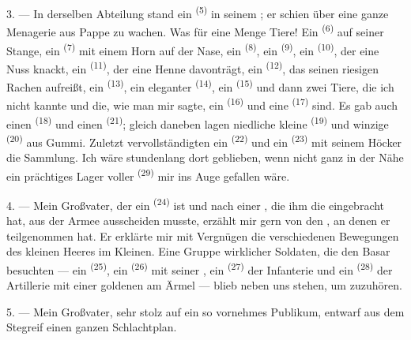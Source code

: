 3. --- In derselben Abteilung stand ein  \textsuperscript{(5)} in
seinem ; er schien über eine ganze Menagerie aus Pappe zu
wachen. Was für eine Menge Tiere! Ein  \textsuperscript{(6)} auf
seiner Stange, ein  \textsuperscript{(7)} mit einem Horn auf der
Nase, ein  \textsuperscript{(8)}, ein 
\textsuperscript{(9)}, ein  \textsuperscript{(10)}, der eine Nuss
knackt, ein  \textsuperscript{(11)}, der eine Henne davonträgt, ein
 \textsuperscript{(12)}, das seinen riesigen Rachen aufreißt, ein
 \textsuperscript{(13)}, ein eleganter 
\textsuperscript{(14)}, ein  \textsuperscript{(15)} und dann zwei
Tiere, die ich nicht kannte und die, wie man mir sagte, ein 
\textsuperscript{(16)} und eine  \textsuperscript{(17)} sind. Es gab
auch einen  \textsuperscript{(18)} und einen 
\textsuperscript{(21)}; gleich daneben lagen niedliche kleine 
\textsuperscript{(19)} und winzige  \textsuperscript{(20)} aus Gummi.
Zuletzt vervollständigten ein  \textsuperscript{(22)} und ein
 \textsuperscript{(23)} mit seinem Höcker die Sammlung. Ich wäre
stundenlang dort geblieben, wenn nicht ganz in der Nähe ein prächtiges Lager voller
 \textsuperscript{(29)} mir ins Auge gefallen wäre.

\VUsaut{4.0mm}
\VUsaut{2.8mm}

4. --- Mein Großvater, der ein  \textsuperscript{(24)} ist
und nach einer , die ihm die 
eingebracht hat, aus der Armee ausscheiden musste, erzählt mir gern von den
, an denen er teilgenommen hat. Er erklärte mir mit Vergnügen die
verschiedenen Bewegungen des kleinen Heeres im Kleinen. Eine Gruppe wirklicher
Soldaten, die den Basar besuchten --- ein  \textsuperscript{(25)}, ein
 \textsuperscript{(26)} mit seiner , ein
 \textsuperscript{(27)} der Infanterie und ein
 \textsuperscript{(28)} der Artillerie mit einer goldenen
 am Ärmel --- blieb neben uns stehen, um zuzuhören.

5. --- Mein Großvater, sehr stolz auf ein so vornehmes Publikum, entwarf aus dem
Stegreif einen ganzen Schlachtplan.

